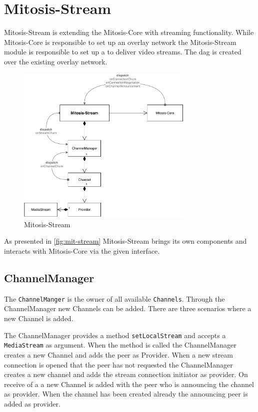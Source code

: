 \section{Mitosis-Stream}\label{chap:mitosis-stream}
Mitosis-Stream is extending the Mitosis-Core with streaming functionality. While Mitosis-Core is responsible to set up an overlay network the Mitosis-Stream module is responsible to set up a  to deliver video streams. The \gls{dag} is created over the existing overlay network.

\begin{figure}
\centering
\includegraphics[width=0.75\textwidth]{graphics/implementation/mitosis-architecture-mitosis-stream.pdf}
\caption{Mitosis-Stream}
\label{fig:mit-stream}
\end{figure}

As presented in \vref{fig:mit-stream} Mitosis-Stream brings its own components and interacts with Mitosis-Core via the given interface. 

\subsection{ChannelManager}
The \lstinline|ChannelManger| is the owner of all available \lstinline|Channels|. Through the ChannelManager new Channels can be added.
There are three scenarios where a new Channel is added.
\begin{enumerate}
     The ChannelManager provides a method \lstinline|setLocalStream| and accepts a \lstinline|MediaStream| as argument. When the method is called the ChannelManager creates a new Channel and adds the peer as Provider.
     When a new stream connection is opened that the peer has not requested the ChannelManager creates a new channel and adds the stream connection initiator as provider.
     On receive of a \channelAnnouncement a new Channel is added with the peer who is announcing the channel as provider. When the channel has been created already the announcing peer is added as provider.
\end{enumerate}

